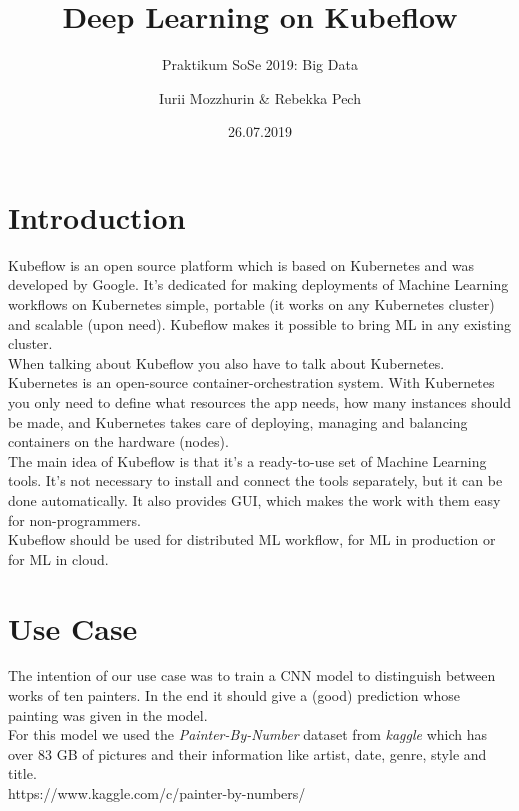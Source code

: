 \documentclass[12pt,a4paper]{scrartcl}		%
\begin{document}
\title{\LARGE Deep Learning on Kubeflow}
\subtitle{\large Praktikum SoSe 2019: Big Data}
\date{26.07.2019}
\author{ \large Iurii Mozzhurin \& Rebekka Pech}
\maketitle



\section{Introduction}

\noindent Kubeflow is an open source platform which is based on Kubernetes and was developed by Google. It's dedicated for making deployments of Machine Learning workflows on Kubernetes simple, portable (it works on any Kubernetes cluster) and scalable (upon need). Kubeflow makes it possible to bring ML in any existing cluster. \\

\noindent When talking about Kubeflow you also have to talk about Kubernetes. Kubernetes is an open-source container-orchestration system. With Kubernetes you only need to define what resources the app needs, how many instances should be made, and Kubernetes takes care of deploying, managing and balancing containers on the hardware (nodes).\\  

\noindent The main idea of Kubeflow is that it's a ready-to-use set of Machine Learning tools. It's not necessary to install and connect the tools separately, but it can be done automatically. It also provides GUI, which makes the work with them easy for non-programmers.\\
 Kubeflow should be used for distributed ML workflow, for ML in production or for ML in cloud.
\section{Use Case}

\noindent The intention of our use case was to train a CNN model to distinguish between works of ten painters. In the end it should give a (good) prediction whose painting was given in the model. \\
For this model we used the \textit{Painter-By-Number} dataset from \textit{kaggle} which has over 83 GB of pictures and their information like artist, date, genre, style and title.\\
https://www.kaggle.com/c/painter-by-numbers/\\
\end{document}
